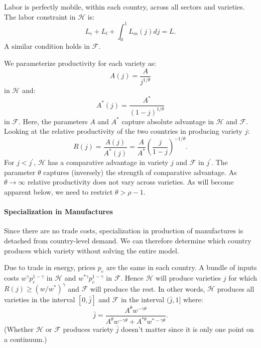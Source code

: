 \documentclass[notitlepage,12pt]{article}
\begin{document}
Labor is perfectly mobile, within each country, across all sectors and
varieties. The labor constraint in $\mathcal{H}$ is:%
\begin{equation*}
L_{e}+L_{l}+\int_{0}^{1}L_{m}(j)dj=L.
\end{equation*}%
A similar condition holds in $\mathcal{F}$.

We parameterize productivity for each variety as:%
\begin{equation*}
A(j)=\frac{A}{j^{1/\theta }}
\end{equation*}%
in $\mathcal{H}$ and:%
\begin{equation*}
A^{\ast }(j)=\frac{A^{\ast }}{\left( 1-j\right) ^{1/\theta }}
\end{equation*}%
in $\mathcal{F}$. Here, the parameters $A$ and $A^{\ast }$ capture absolute
advantage in $\mathcal{H}$ and $\mathcal{F}$. Looking at the relative
productivity of the two countries in producing variety $j$:%
\begin{equation}
R(j)=\frac{A(j)}{A^{\ast }(j)}=\frac{A}{A^{\ast }}\left( \frac{j}{1-j}%
\right) ^{-1/\theta }.  \label{relative productivity}
\end{equation}%
For $j<j^{\prime }$, $\mathcal{H}$ has a comparative advantage in variety $j$
and $\mathcal{F}$ in $j^{\prime }$. The parameter $\theta $ captures
(inversely) the strength of comparative advantage. As $\theta \rightarrow
\infty $ relative productivity does not vary across varieties. As will
become apparent below, we need to restrict $\theta >\rho -1$.

\paragraph{Specialization in Manufactures}

Since there are no trade costs, specialization in production of manufactures
is detached from country-level demand. We can therefore determine which
country produces which variety without solving the entire model.

Due to trade in energy, prices $p_{e}$ are the same in each country. A
bundle of inputs costs $w^{\gamma }p_{e}^{1-\gamma }$ in $\mathcal{H}$ and $%
w^{\ast \gamma }p_{e}^{1-\gamma }$ in $\mathcal{F}$. Hence $\mathcal{H}$
will produce varieties $j$ for which $R(j)\geq \left( w/w^{\ast }\right)
^{\gamma }$ and $\mathcal{F}$ will produce the rest. In other words, $%
\mathcal{H}$ produces all varieties in the interval $[0,\bar{j}]$ and $%
\mathcal{F}$ in the interval $(\bar{j},1]$ where:%
\begin{equation}
\bar{j}=\frac{A^{\theta }w^{-\gamma \theta }}{A^{\theta }w^{-\gamma \theta
}+A^{\ast \theta }w^{\ast -\gamma \theta }}.  \label{jbar}
\end{equation}%
(Whether $\mathcal{H}$ or $\mathcal{F}$ produces variety $\bar{j}$ doesn't
matter since it is only one point on a continuum.)
\end{document}
